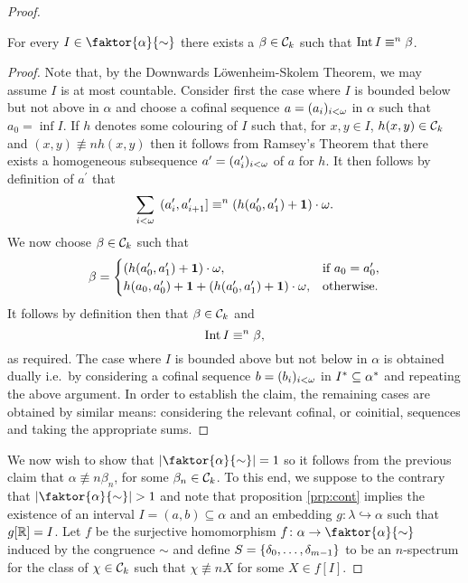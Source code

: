 \begin{proof}
	\begin{claim}\label{clm:contInt}
		For every $I\in\faktor{\alpha}{\sim}$ there exists a $\beta\in\mathcal{C}_k$ such that $\operatorname{Int} I\equiv^{n}\beta$.
	\end{claim}
	\begin{proof}
		Note that, by the Downwards L\"owenheim-Skolem Theorem, we may assume $I$ is at most countable.  Consider first the case where $I$ is bounded below but not above in $\alpha$ and choose a cofinal sequence $a=(a_i)_{i<\omega}$ in $\alpha$ such that $a_0=\inf I$.  If $h$ denotes some colouring of $I$ such that, for $x,y\in I$, $h(x,y)\in\mathcal{C}_k$ and $(x,y)\nequiv{n}h(x,y)$ then it follows from Ramsey's Theorem that there exists a homogeneous subsequence $a^\prime=(a^\prime_i)_{i<\omega}$ of $a$ for $h$.  It then follows by definition of $a^\prime$ that
		\begin{equation}
			\sum_{i<\omega}\phantom{[}(a^\prime_i,a^\prime_{i+1}]\equiv^{n}\left(h(a^\prime_0,a^\prime_1)+\mathbf{1}\right)\cdot\omega.
		\end{equation}
		We now choose $\beta\in\mathcal{C}_k$ such that
		\begin{equation}
			\beta=\begin{cases}
				\left(h(a^\prime_0,a^\prime_1)+\mathbf{1}\right)\cdot\omega,                        & \text{if }a_0=a^\prime_0, \\
				h(a_0,a^\prime_0)+\mathbf{1}+\left(h(a^\prime_0,a^\prime_1)+\mathbf{1}\right)\cdot\omega, & \text{otherwise}.         \\
			\end{cases}
		\end{equation}
		It follows by definition then that $\beta\in\mathcal{C}_k$ and
		\begin{equation}
			\operatorname{Int} I\equiv^{n}\beta,
		\end{equation}
		as required.  The case where $I$ is bounded above but not below in $\alpha$ is obtained dually i.e.\ by considering a cofinal sequence $b=(b_i)_{i<\omega}$ in ${I}^\ast\subseteq{\alpha}^\ast$ and repeating the above argument.  In order to establish the claim, the remaining cases are obtained by similar means: considering the relevant cofinal, or coinitial, sequences and taking the appropriate sums.
	\end{proof}

	We now wish to show that $\card{\faktor{\alpha}{\sim}}=1$ so it follows from the previous claim that $\alpha\nequiv{n}\beta_n$, for some $\beta_n\in\mathcal{C}_k$.  To this end, we suppose to the contrary that $\card{\faktor{\alpha}{\sim}}>1$ and note that proposition \ref{prp:cont} implies the existence of an interval $I=(a,b)\subseteq\alpha$ and an embedding $g\colon\lambda\hookrightarrow\alpha$ such that $g[\mathbb{R}]=I$.  Let $f$ be the surjective homomorphism $f\colon\alpha\to\faktor{\alpha}{\sim}$ induced by the congruence $\sim$ and define $S=\left\lbrace \delta_0,\dotsc,\delta_{m-1}\right\rbrace$ to be an $n$-spectrum for the class of $\chi\in\mathcal{C}_k$ such that $\chi\nequiv{n}X$ for some $X\in f[I]$.


\end{proof}
